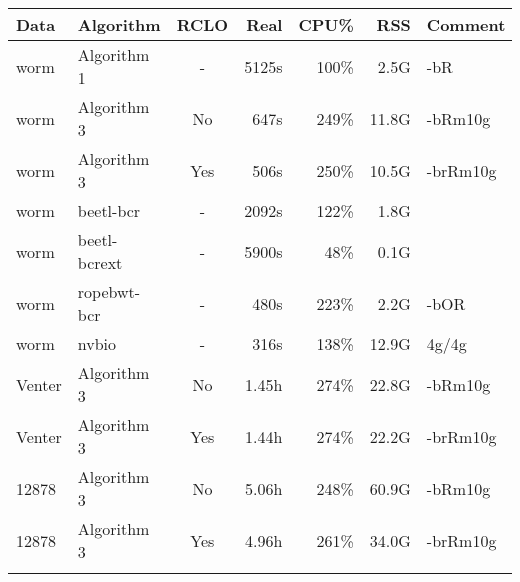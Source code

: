 \documentclass{bioinfo-pre}
\begin{document}
\begin{table}[!htb]
{\footnotesize
\begin{tabular}{llcrrrl}
\toprule
Data & Algorithm   &RCLO&  Real & CPU\% &  RSS & Comment\\
\midrule
worm & Algorithm 1 & -  & 5125s & 100\%&2.5G & -bR \\
worm & Algorithm 3 & No & 647s  & 249\%&11.8G & -bRm10g \\
worm & Algorithm 3 & Yes& 506s  & 250\%&10.5G & -brRm10g \\
worm & beetl-bcr   & -  & 2092s & 122\%&1.8G &\\
worm & beetl-bcrext& -  & 5900s &  48\%&0.1G &\\
worm & ropebwt-bcr & -  & 480s  & 223\%&2.2G & -bOR \\
worm & nvbio       & -  & 316s  & 138\%&12.9G & 4g/4g\\
Venter&Algorithm 3 & No & 1.45h & 274\%&22.8G & -bRm10g \\
Venter&Algorithm 3 & Yes& 1.44h & 274\%&22.2G & -brRm10g \\
12878&Algorithm 3& No &5.06h  & 248\%&60.9G & -bRm10g \\
12878&Algorithm 3& Yes&4.96h  & 261\%&34.0G & -brRm10g \\
\botrule
\end{tabular}}{}
\end{table}


\end{document}
